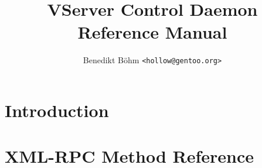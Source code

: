 \documentclass[a4paper,10pt,oneside]{scrbook}
\title{VServer Control Daemon Reference Manual}
\author{Benedikt Böhm \texttt{<hollow@gentoo.org>}}
\begin{document}
\maketitle

\frontmatter
\tableofcontents


\mainmatter

\part{Introduction}




\part{XML-RPC Method Reference}







\backmatter

\end{document}
